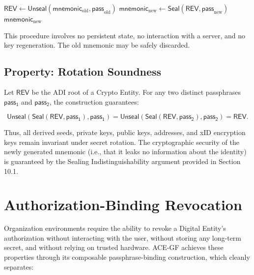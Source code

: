 \documentclass[12pt,a4paper]{article}
\begin{document}
  \begin{algorithm}[h]
   \caption{\textsc{RotateSecret}$(\mathsf{mnemonic}_{\text{old}}, \mathsf{pass}_{\text{old}}, \mathsf{pass}_{\text{new}})$}
   \begin{algorithmic}[1]
  \State $\mathsf{REV} \gets \mathsf{Unseal}(\mathsf{mnemonic}_{\text{old}}, \mathsf{pass}_{\text{old}})$
  \State $\mathsf{mnemonic}_{\text{new}} \gets \mathsf{Seal}(\mathsf{REV}, \mathsf{pass}_{\text{new}})$
  \State \Return $\mathsf{mnemonic}_{\text{new}}$
   \end{algorithmic}
  \end{algorithm}

  This procedure involves no persistent state, no interaction with a server,
  and no key regeneration.
  The old mnemonic may be safely discarded.

  \subsection{Property: Rotation Soundness}

  Let $\mathsf{REV}$ be the ADI root of a Crypto Entity. For any two distinct passphrases $\mathsf{pass_1}$ and $\mathsf{pass_2}$, the construction guarantees:

  \[
   \mathsf{Unseal}(\mathsf{Seal}(\mathsf{REV}, \mathsf{pass_1}), \mathsf{pass_1})
   =
   \mathsf{Unseal}(\mathsf{Seal}(\mathsf{REV}, \mathsf{pass_2}), \mathsf{pass_2})
   =
   \mathsf{REV}.
  \]

  Thus, all derived seeds, private keys, public keys, addresses, and xID encryption keys remain invariant under secret rotation. The cryptographic security of the newly generated mnemonic (i.e., that it leaks no information about the identity) is guaranteed by the Sealing Indistinguishability argument provided in Section 10.1.

  \section{Authorization-Binding Revocation}

  Organization environments require the ability to revoke a Digital Entity’s
  authorization without interacting with the user, without storing any
  long-term secret, and without relying on trusted hardware.
  ACE-GF achieves these properties through its composable passphrase-binding
  construction, which cleanly separates:
\end{document}
